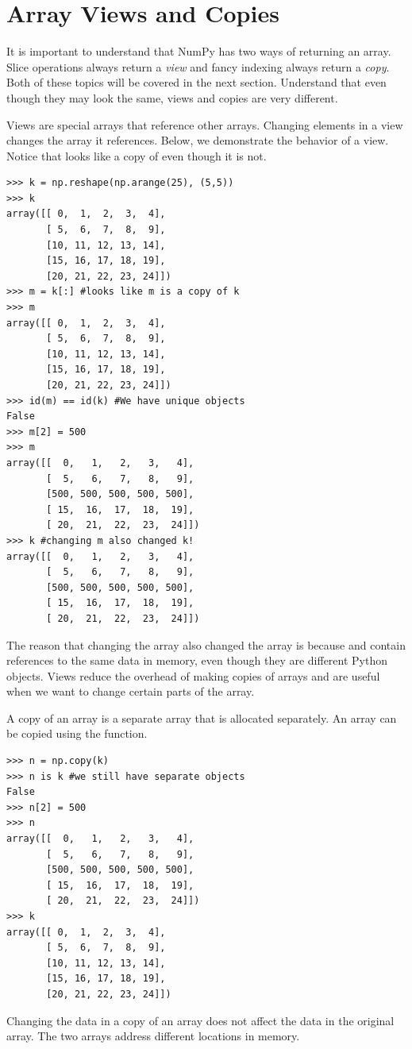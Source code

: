 \section*{Array Views and Copies}
It is important to understand that NumPy has two ways of returning an array.
Slice operations always return a \emph{view} and fancy indexing always return a \emph{copy}.
Both of these topics will be covered in the next section.
Understand that even though they may look the same, views and copies are very different.

Views are special arrays that reference other arrays.
Changing elements in a view changes the array it references.
Below, we demonstrate the behavior of a view.
Notice that  looks like a copy of  even though it is not.
\begin{lstlisting}
>>> k = np.reshape(np.arange(25), (5,5))
>>> k
array([[ 0,  1,  2,  3,  4],
       [ 5,  6,  7,  8,  9],
       [10, 11, 12, 13, 14],
       [15, 16, 17, 18, 19],
       [20, 21, 22, 23, 24]])
>>> m = k[:] #looks like m is a copy of k
>>> m
array([[ 0,  1,  2,  3,  4],
       [ 5,  6,  7,  8,  9],
       [10, 11, 12, 13, 14],
       [15, 16, 17, 18, 19],
       [20, 21, 22, 23, 24]])
>>> id(m) == id(k) #We have unique objects
False
>>> m[2] = 500
>>> m
array([[  0,   1,   2,   3,   4],
       [  5,   6,   7,   8,   9],
       [500, 500, 500, 500, 500],
       [ 15,  16,  17,  18,  19],
       [ 20,  21,  22,  23,  24]])
>>> k #changing m also changed k!
array([[  0,   1,   2,   3,   4],
       [  5,   6,   7,   8,   9],
       [500, 500, 500, 500, 500],
       [ 15,  16,  17,  18,  19],
       [ 20,  21,  22,  23,  24]])
\end{lstlisting}
The reason that changing the array  also changed the array  is because  
and  contain references to the same data in memory, even though they are different 
Python objects.
Views reduce the overhead of making copies of arrays and are useful when we want to change 
certain parts of the array.

A copy of an array is a separate array that is allocated separately.
An array can be copied using the  function.
\begin{lstlisting}
>>> n = np.copy(k)
>>> n is k #we still have separate objects
False
>>> n[2] = 500
>>> n
array([[  0,   1,   2,   3,   4],
       [  5,   6,   7,   8,   9],
       [500, 500, 500, 500, 500],
       [ 15,  16,  17,  18,  19],
       [ 20,  21,  22,  23,  24]])
>>> k
array([[ 0,  1,  2,  3,  4],
       [ 5,  6,  7,  8,  9],
       [10, 11, 12, 13, 14],
       [15, 16, 17, 18, 19],
       [20, 21, 22, 23, 24]])
\end{lstlisting}
Changing the data in a copy of an array does not affect the data in the original array.
The two arrays address different locations in memory.


